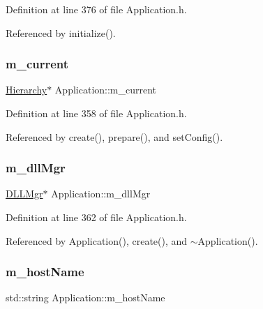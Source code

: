 Definition at line 376 of file Application.\+h.



Referenced by initialize().

\mbox{\label{classApplication_ab0fd877a3c66c41b22109863e1719ccd}} 
\subsubsection{\texorpdfstring{m\+\_\+current}{m\_current}}
{\footnotesize\ttfamily \hyperlink{classHierarchy}{Hierarchy}$\ast$ Application\+::m\+\_\+current\hspace{0.3cm}{\ttfamily [protected]}}



Definition at line 358 of file Application.\+h.



Referenced by create(), prepare(), and set\+Config().

\mbox{\label{classApplication_a66b06cbeb824fe00ecd11499fcf01c55}} 
\subsubsection{\texorpdfstring{m\+\_\+dll\+Mgr}{m\_dllMgr}}
{\footnotesize\ttfamily \hyperlink{classDLLMgr}{D\+L\+L\+Mgr}$\ast$ Application\+::m\+\_\+dll\+Mgr\hspace{0.3cm}{\ttfamily [private]}}



Definition at line 362 of file Application.\+h.



Referenced by Application(), create(), and $\sim$\+Application().

\mbox{\label{classApplication_a20094c2bf311e2046942eeeec4a11f02}} 
\subsubsection{\texorpdfstring{m\+\_\+host\+Name}{m\_hostName}}
{\footnotesize\ttfamily std\+::string Application\+::m\+\_\+host\+Name\hspace{0.3cm}{\ttfamily [protected]}}



